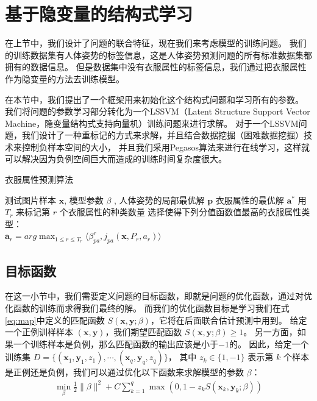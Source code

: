 \section{基于隐变量的结构式学习}
在上节中，我们设计了问题的联合特征，现在我们来考虑模型的训练问题。
我们的训练数据集有人体姿势的标签信息，这是人体姿势预测问题的所有标准数据集都拥有的数据信息。
但是数据集中没有衣服属性的标签信息，我们通过把衣服属性作为隐变量的方法去训练模型。

在本节中，我们提出了一个框架用来初始化这个结构式问题和学习所有的参数。
我们将问题的参数学习部分转化为一个LSSVM（Latent Structure Support Vector Machine，隐变量结构式支持向量机）训练问题来进行求解。
对于一个LSSVM问题，我们设计了一种重标记的方式来求解，并且结合数据挖掘（困难数据挖掘）技术来控制负样本空间的大小，
并且我们采用Pegasos\cite{pegasos}算法来进行在线学习，这样就可以解决因为负例空间巨大而造成的训练时间复杂度很大。

\begin{algorithm}
\caption{衣服属性预测算法}
\begin{algorithmic}[1]
    \REQUIRE 测试图片样本 $\mathbf{x}$, 模型参数 $\beta$ , 人体姿势的局部最优解 $\mathbf{p}$
    \ENSURE 衣服属性的最优解 $\mathbf{a^*}$
    \STATE 用 $T_r$ 来标记第 $r$ 个衣服属性的种类数量
        \STATE 选择使得下列分值函数值最高的衣服属性类型：\\
            $\mathbf{a}_r = arg \max_{1 \leq r \leq T_r} \langle \beta_{pa}^r, j_{pa}(\mathbf{x}, P_r, a_r) \rangle $
    \ENDFOR
\end{algorithmic}
\label{alg:attr}
\end{algorithm}


\subsection{目标函数}
在这一小节中，我们需要定义问题的目标函数，即就是问题的优化函数，通过对优化函数的训练而求得我们最终的解。
而我们的优化函数目标是学习我们在式\ref{eq:map}中定义的匹配函数 $S(\mathbf{x}, \mathbf{y}; \beta)$，它将在后面联合估计预测中用到。
给定一个正例训样样本 $(\mathbf{x}, \mathbf{y})$，我们期望匹配函数 $S(\mathbf{x}, \mathbf{y}; \beta) \geq 1$。
另一方面，如果一个训练样本是负例，那么匹配函数的输出应该是小于$-1$的。
因此，给定一个训练集 $D = \{ (\mathbf{x}_1, \mathbf{y}_1, z_1), \cdots, (\mathbf{x}_q, \mathbf{y}_q, z_q) \}$， 其中 $z_k \in \{1, -1\}$ 表示第 $k$ 个样本是正例还是负例，我们可以通过优化以下函数来求解模型的参数 $\beta$：
\begin{equation}
\begin{split}
\min_{\beta}  \frac{1}{2} \|\beta\|^2 + C \sum_{k=1}^{q}\max(0, 1 - z_k S(\mathbf{x}_k, \mathbf{y}_k; \beta))
    \label{eq:latent}
\end{split}
\end{equation}

